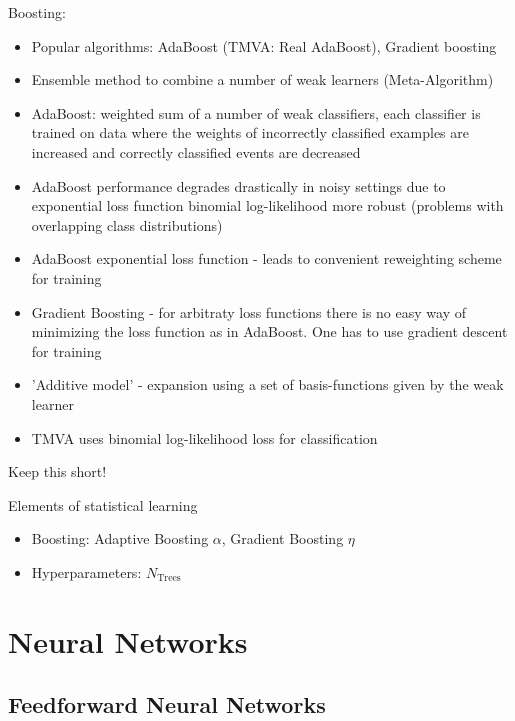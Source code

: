 Boosting:
\begin{itemize}
\item Popular algorithms: AdaBoost (TMVA: Real AdaBoost), Gradient boosting
\item Ensemble method to combine a number of weak learners (Meta-Algorithm)
\item AdaBoost: weighted sum of a number of weak classifiers, each classifier is
  trained on data where the weights of incorrectly classified examples are
  increased and correctly classified events are decreased
\item AdaBoost performance degrades drastically in noisy settings due to
  exponential loss function \cite{esl} binomial log-likelihood more robust
  (problems with overlapping class distributions)
\item AdaBoost exponential loss function - leads to convenient reweighting
  scheme for training
\item Gradient Boosting - for arbitraty loss functions there is no easy way of
  minimizing the loss function as in AdaBoost. One has to use gradient descent
  for training
\item 'Additive model' - expansion using a set of basis-functions given by the
  weak learner
\item TMVA uses binomial log-likelihood loss for classification\cite{tmva}
\end{itemize}

Keep this short!

Elements of statistical learning \cite{esl}

\begin{itemize}
\item Boosting: Adaptive Boosting $\alpha$, Gradient Boosting $\eta$
\item Hyperparameters: $N_\mathrm{Trees}$
\end{itemize}

\section{Neural Networks}
\label{sec:nn}


\subsection{Feedforward Neural Networks}
\label{sec:nn_feedforward}

